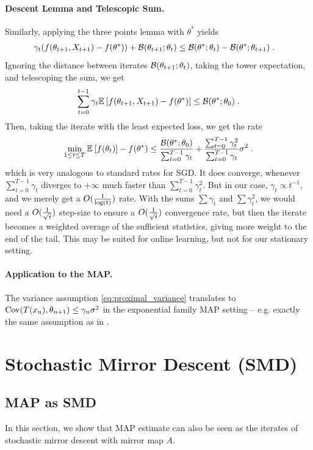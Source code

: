 \documentclass{article}
\newcommand*{\expect}[2][]{\ensuremath{\mathbb{E}_{#1} \left[ #2 \right] }} %
\newcommand{\logpart}{A}
\newcommand{\natp}{\theta}
\newcommand{\lr}{\gamma} %
\begin{document}
\paragraph{Descent Lemma and Telescopic Sum.}
Similarly, applying the three points lemma with $\natp^*$ yields
\begin{align}
	\lr_t(f(\natp_{t+1},X_{t+1}) - f(\natp^*)) +  \cB(\natp_{t+1} ; \natp_{t})
	&\leq  \cB( \natp^*; \natp_{t})  - \cB( \natp^*; \natp_{t+1}) \; .
\end{align}
Ignoring the distance between iterates $\cB(\natp_{t+1} ; \natp_{t})
$, taking the tower expectation, and telescoping the sum, we get
\begin{align}
	\sum_{t=0}^{t-1} \lr_t \expect{f(\natp_{t+1},X_{t+1}) - f(\natp^*)}
	\leq \cB( \natp^*; \natp_{0})  \; .
\end{align}
Then, taking the iterate with the least expected loss, we get the rate
\begin{align}
	 \min_{1\leq t \leq T} \expect{ f(\natp_t)} - f(\natp^*)
	\leq \frac{\cB( \natp^*; \natp_{0}) }{\sum_{t=0}^{T-1} \lr_t}
	+ \frac{\sum_{t=0}^{T-1} \lr_t^2  }{\sum_{t=0}^{T-1} \lr_t} \sigma^2 \; .
\end{align}
which is very analogous to standard rates for SGD.
It does converge, whenever $\sum_{t=0}^{T-1} \lr_t$ diverges to $+\infty$ much faster than $\sum_{t=0}^{T-1} \lr_t^2$.
But in our case, $\lr_t \propto t^{-1}$, and we merely get a $O(\frac{1}{\log(t)})$ rate.
With the sums  $\sum \lr_t$ and $\sum \lr_t^2$, we would need a $O(\frac{1}{\sqrt{t}})$ step-size to ensure a $O(\frac{1}{\sqrt{t}})$ convergence rate, but then the iterate becomes a weighted average of the sufficient statistics, giving more weight to the end of the tail. This may be suited for online learning, but not for our stationary setting.

\paragraph{Application to the MAP.}
The variance assumption \eqref{eq:proximal_variance} translates to $\Cov(T(x_{n}) , \natp_{n+1}) \leq  \gamma_n \sigma^2$ in the exponential family MAP setting -- e.g. exactly the same assumption as in \citet{hanzely2018fastest}.


\section{Stochastic Mirror Descent (SMD)}
\subsection{MAP as SMD}
In this section, we show that MAP estimate can also be seen as the iterates of stochastic mirror descent with mirror map $\logpart$.
\end{document}
